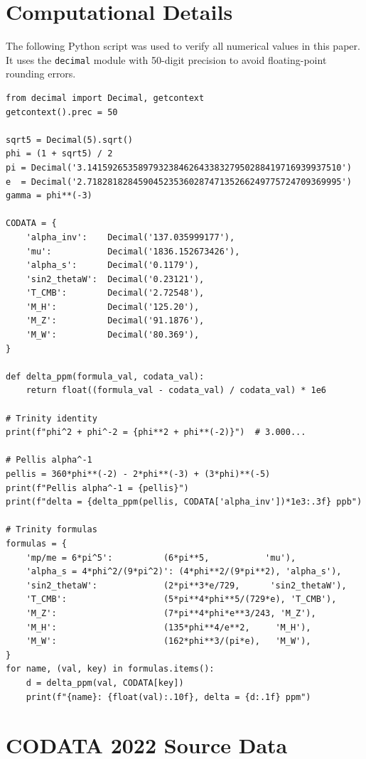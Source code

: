 \documentclass[11pt,a4paper]{article}
\begin{document}
\section{Computational Details}\label{app:code}

The following Python script was used to verify all numerical values in this
paper. It uses the \texttt{decimal} module with 50-digit precision to avoid
floating-point rounding errors.

\begin{small}
\begin{verbatim}
from decimal import Decimal, getcontext
getcontext().prec = 50

sqrt5 = Decimal(5).sqrt()
phi = (1 + sqrt5) / 2
pi = Decimal('3.14159265358979323846264338327950288419716939937510')
e  = Decimal('2.71828182845904523536028747135266249775724709369995')
gamma = phi**(-3)

CODATA = {
    'alpha_inv':    Decimal('137.035999177'),
    'mu':           Decimal('1836.152673426'),
    'alpha_s':      Decimal('0.1179'),
    'sin2_thetaW':  Decimal('0.23121'),
    'T_CMB':        Decimal('2.72548'),
    'M_H':          Decimal('125.20'),
    'M_Z':          Decimal('91.1876'),
    'M_W':          Decimal('80.369'),
}

def delta_ppm(formula_val, codata_val):
    return float((formula_val - codata_val) / codata_val) * 1e6

# Trinity identity
print(f"phi^2 + phi^-2 = {phi**2 + phi**(-2)}")  # 3.000...

# Pellis alpha^-1
pellis = 360*phi**(-2) - 2*phi**(-3) + (3*phi)**(-5)
print(f"Pellis alpha^-1 = {pellis}")
print(f"delta = {delta_ppm(pellis, CODATA['alpha_inv'])*1e3:.3f} ppb")

# Trinity formulas
formulas = {
    'mp/me = 6*pi^5':          (6*pi**5,           'mu'),
    'alpha_s = 4*phi^2/(9*pi^2)': (4*phi**2/(9*pi**2), 'alpha_s'),
    'sin2_thetaW':             (2*pi**3*e/729,      'sin2_thetaW'),
    'T_CMB':                   (5*pi**4*phi**5/(729*e), 'T_CMB'),
    'M_Z':                     (7*pi**4*phi*e**3/243, 'M_Z'),
    'M_H':                     (135*phi**4/e**2,     'M_H'),
    'M_W':                     (162*phi**3/(pi*e),   'M_W'),
}
for name, (val, key) in formulas.items():
    d = delta_ppm(val, CODATA[key])
    print(f"{name}: {float(val):.10f}, delta = {d:.1f} ppm")
\end{verbatim}
\end{small}

\section{CODATA 2022 Source Data}\label{app:codata}
\end{document}

